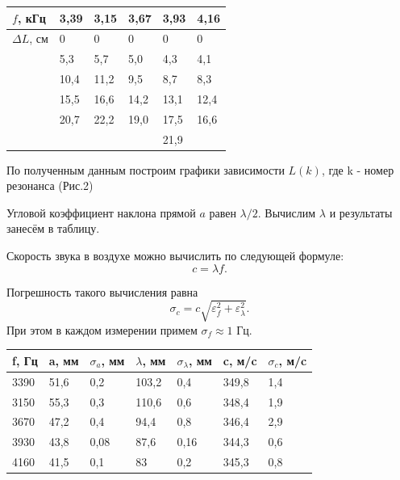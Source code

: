\documentclass[a4paper,12pt]{article} %
\begin{document}
\begin{table}[h!]
\begin{tabular}{|l|l|l|l|l|l|}
\hline
$f$,  кГц & 3,39 & 3,15 & 3,67 & 3,93 & 4,16 \\ \hline
$\Delta L$, см  & 0    & 0     & 0     & 0     & 0  \\ \cline{2-6} 
        & 5,3  & 5,7   & 5,0     & 4,3   & 4,1  \\ \cline{2-6} 
        & 10,4 & 11,2  & 9,5   & 8,7   & 8,3 \\ \cline{2-6} 
        & 15,5 & 16,6  & 14,2  & 13,1  & 12,4 \\ \cline{2-6} 
        & 20,7 & 22,2  & 19,0    & 17,5  & 16,6 \\ \cline{2-6} 
        &      &       &       & 21,9  &      \\ \hline
       
\end{tabular}
\end{table}


\noindent По полученным данным построим графики зависимости $ L(k) $, где k - номер резонанса (Рис.2)

\medskip
 
\noindent Угловой коэффициент наклона прямой $ a $ равен $ \lambda/2 $. Вычислим $ \lambda $ и результаты занесём в таблицу.

\medskip

\noindent Скорость звука в воздухе можно вычислить по следующей формуле: 
\[ c = \lambda f. \]

\noindent Погрешность такого вычисления равна \[ \sigma_c=c\sqrt{\varepsilon_f^2+\varepsilon_\lambda^2}. \] При этом в каждом измерении примем $ \sigma_f \approx 1 $ Гц.

\medskip

\begin{table}[h!]
\begin{tabular}{|l|l|l|l|l|l|l|}
\hline
f,  Гц & a, мм & $\sigma_a$, мм & $\lambda$, мм & $\sigma_\lambda$, мм & c, м/c  & $\sigma_c$, м/c \\ \hline
3390   & 51,6  & 0,2         & 103,2      & 0,4         & 349,8 & 1,4        \\ \hline
3150   & 55,3  & 0,3         & 110,6      & 0,6         & 348,4  & 1,9         \\ \hline
3670   & 47,2  & 0,4         & 94,4       & 0,8         & 346,4 & 2,9        \\ \hline
3930   & 43,8  & 0,08        & 87,6       & 0,16        & 344,3 & 0,6       \\ \hline
4160   & 41,5  & 0,1         & 83         & 0,2         & 345,3  & 0,8        \\ \hline
\end{tabular}
\end{table}
\end{document}
